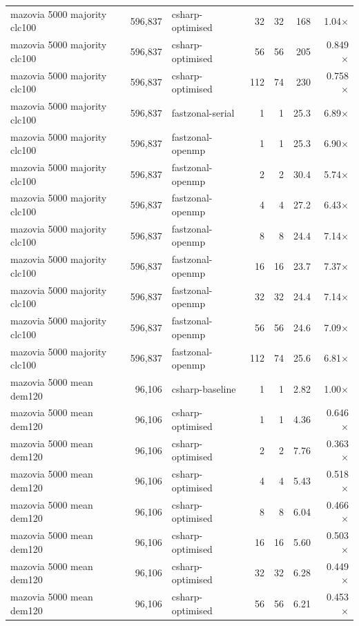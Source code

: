 \begin{tabular}{lrlrrrr}
mazovia 5000 majority clc100 & 596,837 & csharp-optimised & 32 & 32 & 168 & 1.04$\times$ \\
mazovia 5000 majority clc100 & 596,837 & csharp-optimised & 56 & 56 & 205 & 0.849$\times$ \\
mazovia 5000 majority clc100 & 596,837 & csharp-optimised & 112 & 74 & 230 & 0.758$\times$ \\
mazovia 5000 majority clc100 & 596,837 & fastzonal-serial & 1 & 1 & 25.3 & 6.89$\times$ \\
mazovia 5000 majority clc100 & 596,837 & fastzonal-openmp & 1 & 1 & 25.3 & 6.90$\times$ \\
mazovia 5000 majority clc100 & 596,837 & fastzonal-openmp & 2 & 2 & 30.4 & 5.74$\times$ \\
mazovia 5000 majority clc100 & 596,837 & fastzonal-openmp & 4 & 4 & 27.2 & 6.43$\times$ \\
mazovia 5000 majority clc100 & 596,837 & fastzonal-openmp & 8 & 8 & 24.4 & 7.14$\times$ \\
mazovia 5000 majority clc100 & 596,837 & fastzonal-openmp & 16 & 16 & 23.7 & 7.37$\times$ \\
mazovia 5000 majority clc100 & 596,837 & fastzonal-openmp & 32 & 32 & 24.4 & 7.14$\times$ \\
mazovia 5000 majority clc100 & 596,837 & fastzonal-openmp & 56 & 56 & 24.6 & 7.09$\times$ \\
mazovia 5000 majority clc100 & 596,837 & fastzonal-openmp & 112 & 74 & 25.6 & 6.81$\times$ \\
mazovia 5000 mean dem120 & 96,106 & csharp-baseline & 1 & 1 & 2.82 & 1.00$\times$ \\
mazovia 5000 mean dem120 & 96,106 & csharp-optimised & 1 & 1 & 4.36 & 0.646$\times$ \\
mazovia 5000 mean dem120 & 96,106 & csharp-optimised & 2 & 2 & 7.76 & 0.363$\times$ \\
mazovia 5000 mean dem120 & 96,106 & csharp-optimised & 4 & 4 & 5.43 & 0.518$\times$ \\
mazovia 5000 mean dem120 & 96,106 & csharp-optimised & 8 & 8 & 6.04 & 0.466$\times$ \\
mazovia 5000 mean dem120 & 96,106 & csharp-optimised & 16 & 16 & 5.60 & 0.503$\times$ \\
mazovia 5000 mean dem120 & 96,106 & csharp-optimised & 32 & 32 & 6.28 & 0.449$\times$ \\
mazovia 5000 mean dem120 & 96,106 & csharp-optimised & 56 & 56 & 6.21 & 0.453$\times$ \\

\end{tabular}
